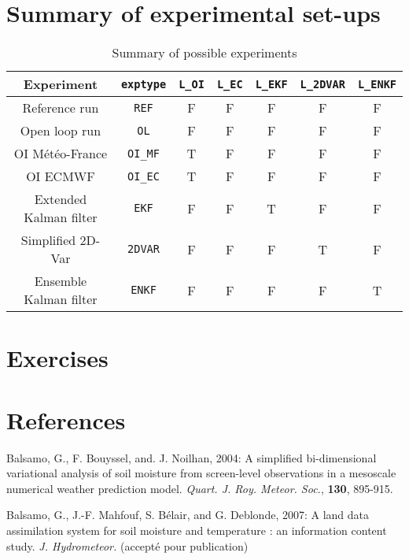 \documentclass[12pt]{article}
\newcommand{\bc}{\begin{center}}
\newcommand{\ec}{\end{center}}
\begin{document}
{{{\section{Summary of experimental set-ups}
\begin{table}[h]
\bc
\begin{tabular}{|c|c|c|c|c|c|c|}
\hline
Experiment & {\tt exptype} & {\tt L\_OI} & {\tt L\_EC} & {\tt L\_EKF} & {\tt L\_2DVAR} & {\tt L\_ENKF} \\
\hline
Reference run & {\tt REF} & F & F & F & F & F \\
\hline
Open loop run & {\tt OL} & F & F & F & F & F \\
\hline
OI M\'et\'eo-France & {\tt OI\_MF} & T & F & F & F & F \\
\hline
OI ECMWF & {\tt OI\_EC} & T & F & F & F & F \\
\hline
Extended Kalman filter & {\tt EKF}  & F & F & T & F & F \\
\hline
Simplified 2D-Var & {\tt 2DVAR} & F & F & F & T & F \\
\hline
Ensemble Kalman filter & {\tt ENKF} & F & F & F & F & T \\
\hline
\end{tabular}
\caption{Summary of possible experiments}
\ec
\end{table}
\section{Exercises}
\section{References}
\begin{description}
\item Balsamo, G., F. Bouyssel, and. J. Noilhan, 2004:
A simplified bi-dimensional variational analysis of soil moisture from
screen-level observations in a mesoscale numerical weather prediction model.
{\it Quart. J. Roy. Meteor. Soc.}, {\bf 130}, 895-915.


\item Balsamo, G., J.-F. Mahfouf, S. B\'elair, and G. Deblonde, 2007:
A land data assimilation system for soil moisture and temperature : an
information content study. {\it J. Hydrometeor.}
(accept\'e pour publication)


\end{description}}}}
\end{document}
